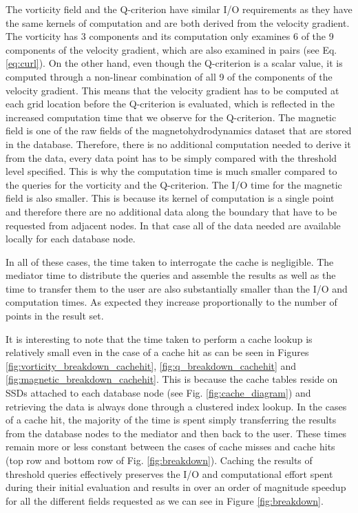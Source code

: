 \documentclass{sig-alternate}
\begin{document}
The vorticity field and the Q-criterion have similar I/O requirements as they
have the same kernels of computation and are both derived from the velocity gradient. The vorticity has 3 components and its computation only examines
6 of the 9 components of the velocity gradient, which are also examined in pairs (see Eq. \ref{eq:curl}). On the other hand, even though the Q-criterion is a
scalar value, it is computed through a non-linear combination of all 9 of the components of the velocity gradient. This means that the velocity gradient has
to be computed at each grid location before the Q-criterion is evaluated, which is reflected in the increased computation time that we observe for the
Q-criterion. The magnetic field is one of the raw fields of the magnetohydrodynamics dataset that are stored in the database. Therefore, there is no
additional computation needed to derive it from the data, every data point has to be simply compared with the threshold level specified. This is why the 
computation time is much smaller compared to the queries for the vorticity and the Q-criterion. The I/O time for the magnetic field is also smaller. This is
because its kernel of computation is a single point and therefore there are no additional data along the boundary that have to be requested from adjacent 
nodes. In that case all of the data needed are available locally for each database node.

In all of these cases, the time taken to interrogate the cache is negligible. The mediator time to distribute the queries and assemble the results as well as the
time to transfer them to the user are also substantially smaller than the I/O and computation times. As expected they increase proportionally to the number
of points in the result set.

It is interesting to note that the time taken to perform a cache lookup is relatively small even in the case of a cache hit as can be seen in Figures 
\ref{fig:vorticity_breakdown_cachehit}, \ref{fig:q_breakdown_cachehit} and \ref{fig:magnetic_breakdown_cachehit}. This is because the cache tables reside on
SSDs attached to each database node (see Fig. \ref{fig:cache_diagram}) and retrieving the data is always done through a clustered index lookup.
In the cases of a cache hit, the majority of the time is spent simply transferring the results from the database nodes to the mediator and then back to the user.
These times remain more or less constant between the cases of cache misses and cache hits (top row and bottom row of Fig. \ref{fig:breakdown}).
Caching the results of threshold queries
effectively preserves the I/O and computational effort spent during their initial evaluation and results in over an order of magnitude speedup for all the
different fields requested as we can see in Figure \ref{fig:breakdown}.
\end{document}
